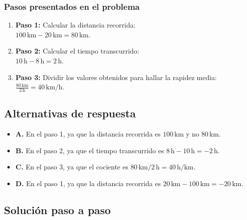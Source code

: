 \documentclass[
]{article}
\providecommand{\tightlist}{%
  \setlength{\itemsep}{0pt}\setlength{\parskip}{0pt}}
\begin{document}
\subsubsection{Pasos presentados en el
problema}\label{pasos-presentados-en-el-problema}

\begin{enumerate}
\def\labelenumi{\arabic{enumi}.}
\item
  \textbf{Paso 1:} Calcular la distancia recorrida:\\
  \(100 \, \text{km} - 20 \, \text{km} = 80 \, \text{km}\).
\item
  \textbf{Paso 2:} Calcular el tiempo transcurrido:\\
  \(10 \, \text{h} - 8 \, \text{h} = 2 \, \text{h}\).
\item
  \textbf{Paso 3:} Dividir los valores obtenidos para hallar la rapidez
  media:\\
  \(\frac{80 \, \text{km}}{2 \, \text{h}} = 40 \, \text{km/h}\).
\end{enumerate}

\subsection{Alternativas de respuesta}\label{alternativas-de-respuesta}

\begin{itemize}
\tightlist
\item
  \textbf{A.} En el paso 1, ya que la distancia recorrida es
  \(100 \, \text{km}\) y no \(80 \, \text{km}\).\\
\item
  \textbf{B.} En el paso 2, ya que el tiempo transcurrido es
  \(8 \, \text{h} - 10 \, \text{h} = -2 \, \text{h}\).\\
\item
  \textbf{C.} En el paso 3, ya que el cociente es
  \(80 \, \text{km}/2 \, \text{h} = 40 \, \text{h/km}\).\\
\item
  \textbf{D.} En el paso 1, ya que la distancia recorrida es
  \(20 \, \text{km} - 100 \, \text{km} = -20 \, \text{km}\).
\end{itemize}

\subsection{Solución paso a paso}\label{soluciuxf3n-paso-a-paso}
\end{document}
